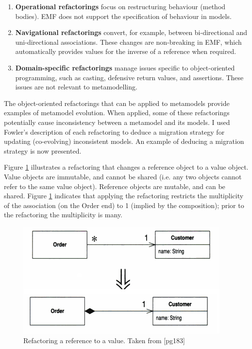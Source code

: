 \begin{enumerate}
	\item \textbf{Operational refactorings} focus on restructuring behaviour (method bodies). EMF does not support the specification of behaviour in models.
	\item \textbf{Navigational refactorings} convert, for example, between bi-directional and uni-directional associations. These changes are non-breaking in EMF, which automatically provides values for the inverse of a reference when required.
	\item \textbf{Domain-specific refactorings} manage issues specific to object-oriented programming, such as casting, defensive return values, and assertions. These issues are not relevant to metamodelling.
\end{enumerate}

The object-oriented refactorings that can be applied to metamodels provide examples of metamodel evolution. When applied, some of these refactorings potentially cause inconsistency between a metamodel and its models. I used Fowler's description of each refactoring to deduce a migration strategy for updating (co-evolving) inconsistent models. An example of deducing a migration strategy is now presented.

Figure \ref{fig:refactoring} illustrates a refactoring that changes a reference object to a value object. Value objects are immutable, and cannot be shared (i.e. any two objects cannot refer to the same value object). Reference objects are mutable, and can be shared. Figure \ref{fig:refactoring} indicates that applying the refactoring restricts the multiplicity of the association (on the Order end) to 1 (implied by the composition); prior to the refactoring the multiplicity is many.

\begin{figure}[htbp]
  \begin{center}
    \leavevmode
    \includegraphics[scale=0.5]{refactoring.png}
  \end{center}
  \caption{Refactoring a reference to a value. Taken from \cite{fowler99refactoring}[pg183]}
  \label{fig:refactoring}
\end{figure}

